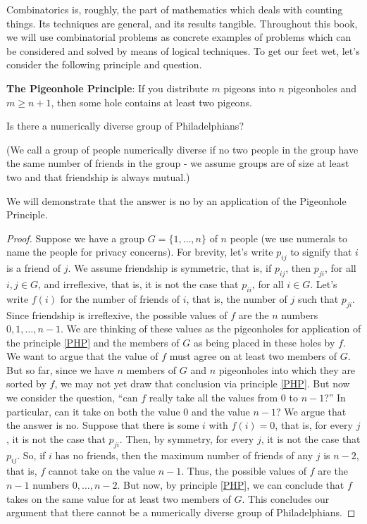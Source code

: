 Combinatorics is, roughly, the part of mathematics which deals with counting things. Its techniques are general, and its results tangible. Throughout this book, we will use combinatorial problems as concrete examples of problems which can be considered and solved by means of logical techniques. To get our feet wet, let's consider the following principle and question. 

\begin{principle}\label{PHP}
\textbf{The Pigeonhole Principle}: If you distribute $m$ pigeons into $n$ pigeonholes and $m\geq n+1$, then some hole contains at least two pigeons.
\end{principle}

\begin{example}
\label{numDiv}
Is there a numerically diverse group of Philadelphians?
\end{example}

(We call a group of people numerically diverse if no two people in the group have the same number of friends in the group - we assume groups are of size at least two and that friendship is always mutual.) 

We will demonstrate that the answer is no by an application of the Pigeonhole Principle. 
\begin{proof}
Suppose we have a group $G=\{1,\ldots,n\}$ of $n$ people (we use numerals to name the people for privacy concerns). For brevity, let's write $p_{ij}$ to signify that $i$ is a friend of $j$. We assume friendship is symmetric, that is, if $p_{ij}$, then $p_{ji}$, for all $i,j\in G$, and irreflexive, that is, it is not the case that $p_{ii}$, for all $i\in G$. Let's write $f(i)$ for the number of friends of $i$, that is, the number of $j$ such that $p_{ji}$. Since friendship is irreflexive, the possible values of $f$ are the $n$ numbers $0, 1,\ldots,n-1$. We are thinking of these values as the pigeonholes for application of the principle \ref{PHP} and the members of $G$ as being placed in these holes by $f$. We want to argue that the value of $f$ must agree on at least two members of $G$. But so far, since we have $n$ members of $G$ and $n$ pigeonholes into which they are sorted by $f$, we may not yet draw that conclusion via principle \ref{PHP}. But now we consider the question, ``can $f$ really take all the values from $0$ to $n-1$?'' In particular, can it take on both the value $0$ and the value $n-1$? We argue that the answer is no. Suppose that there is some $i$ with $f(i)=0$, that is, for every $j$, it is not the case that $p_{ji}$. Then, by symmetry, for every $j$, it is not the case that $p_{ij}$. So, if $i$ has no friends, then the maximum number of friends of any $j$ is $n-2$, that is, $f$ cannot take on the value $n-1$. Thus, the possible values of $f$ are the $n-1$ numbers $0,\ldots,n-2$. But now, by principle \ref{PHP}, we can conclude that $f$ takes on the same value for at least two members of $G$. This concludes our argument that there cannot be a numerically diverse group of Philadelphians. 
\end{proof}

